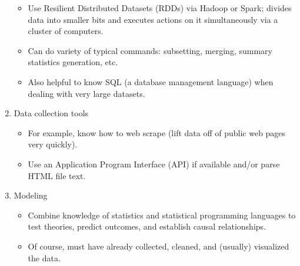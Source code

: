 \documentclass{homeworg}
\begin{document}
\begin{enumerate}
\begin{itemize}
       \item Use Resilient Distributed Datasets (RDDs) via Hadoop or Spark; divides data into smaller bits and executes actions on it simultaneously via a cluster of computers.
       \item Can do variety of typical commands: subsetting, merging, summary statistics generation, etc.
       \item Also helpful to know SQL (a database management language) when dealing with very large datasets. 
   \end{itemize}
   \item Data collection tools
   \begin{itemize}
       \item For example, know how to web scrape (lift data off of public web pages very quickly).
       \item  Use an Application Program Interface (API) if available and/or parse HTML file text.
   \end{itemize}
   \item Modeling
   \begin{itemize}
       \item Combine knowledge of statistics and statistical programming languages to test theories, predict outcomes, and establish causal relationships.
       \item Of course, must have already collected, cleaned, and (usually) visualized the data.
   \end{itemize}
\end{enumerate}
\end{document}

